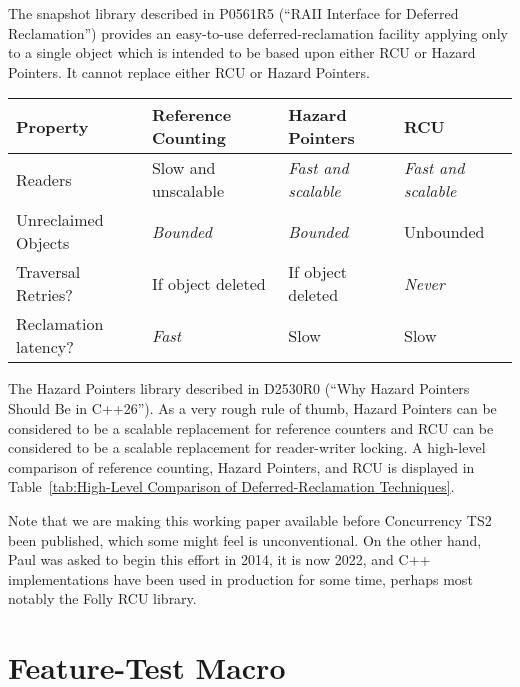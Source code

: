 The snapshot library described in P0561R5 (``RAII Interface for Deferred
Reclamation'') provides an easy-to-use deferred-reclamation facility
applying only to a single object which is intended to be based upon
either RCU or Hazard Pointers.
It cannot replace either RCU or Hazard Pointers.

\begin{table*}
\renewcommand*{\arraystretch}{1.25}
\footnotesize
\centering
\begin{tabular}{l|lll}
	Property
		& Reference Counting
			& Hazard Pointers
				& RCU \\
	\hline
	\hline
	Readers
		& Slow and unscalable
			& \emph{Fast and scalable}
				& \emph{Fast and scalable} \\
	\hline
	Unreclaimed Objects
		& \emph{Bounded}
			& \emph{Bounded}
				& Unbounded \\
	\hline
	Traversal Retries?
		& If object deleted
			& If object deleted
				& \emph{Never} \\
	\hline
	Reclamation latency?
		& \emph{Fast}
			& Slow
				& Slow \\
\end{tabular}
\caption{High-Level Comparison of Deferred-Reclamation Techniques}
\label{tab:High-Level Comparison of Deferred-Reclamation Techniques}
\end{table*}

The Hazard Pointers library described in D2530R0 (``Why Hazard Pointers
Should Be in C++26'').
As a very rough rule of thumb, Hazard Pointers can be considered to be
a scalable replacement for reference counters and RCU can be considered
to be a scalable replacement for reader-writer locking.
A high-level comparison of reference counting, Hazard Pointers, and RCU
is displayed in
Table~\ref{tab:High-Level Comparison of Deferred-Reclamation Techniques}.

Note that we are making this working paper available before Concurrency
TS2 been published, which some might feel is unconventional.
On the other hand, Paul was asked to begin this effort in 2014, it is now
2022, and C++ implementations have been used in production for some time,
perhaps most notably the Folly RCU library.

\section{Feature-Test Macro}
\label{sec:Feature-Test Macro}

